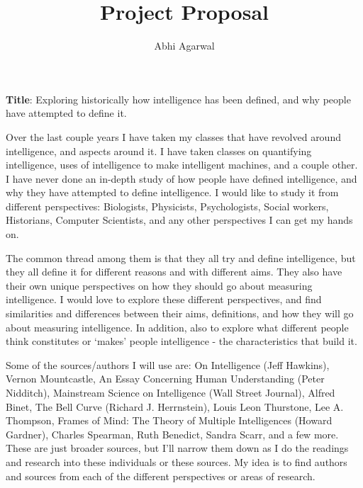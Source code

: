 \documentclass[11pt, oneside]{article}
\title{Project Proposal\vspace{-0.4cm}}
\author{Abhi Agarwal\vspace{-1cm}}
\date{}
\begin{document}
\maketitle

\noindent \textbf{Title}: Exploring historically how intelligence has been defined, and why people have attempted to define it.

\par Over the last couple years I have taken my classes that have revolved around intelligence, and aspects around it. I have taken classes on quantifying intelligence, uses of intelligence to make intelligent machines, and a couple other. I have never done an in-depth study of how people have defined intelligence, and why they have attempted to define intelligence. I would like to study it from different perspectives: Biologists, Physicists, Psychologists, Social workers, Historians, Computer Scientists, and any other perspectives I can get my hands on.

\par The common thread among them is that they all try and define intelligence, but they all define it for different reasons and with different aims. They also have their own unique perspectives on how they should go about measuring intelligence. I would love to explore these different perspectives, and find similarities and differences between their aims, definitions, and how they will go about measuring intelligence. In addition, also to explore what different people think constitutes or `makes' people intelligence - the characteristics that build it. 

\par Some of the sources/authors I will use are: On Intelligence (Jeff Hawkins), Vernon Mountcastle, An Essay Concerning Human Understanding (Peter Nidditch), Mainstream Science on Intelligence (Wall Street Journal), Alfred Binet, The Bell Curve (Richard J. Herrnstein), Louis Leon Thurstone, Lee A. Thompson, Frames of Mind: The Theory of Multiple Intelligences (Howard Gardner), Charles Spearman, Ruth Benedict, Sandra Scarr, and a few more. These are just broader sources, but I'll narrow them down as I do the readings and research into these individuals or these sources. My idea is to find authors and sources from each of the different perspectives or areas of research.
\end{document}

